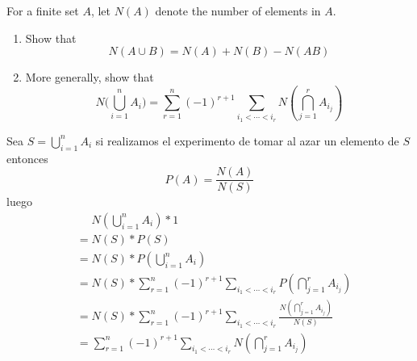 \item For a finite set $A$, let $N(A)$ denote the number of elements in $A$.
\begin{enumerate}
    \item Show that
    \[ N(A \cup B) = N(A) + N(B) - N(AB) \]

    
    \item More generally, show that
    \[
        N\Big( \bigcup_{i=1}^n A_i \Big) = \sum_{r=1}^n (-1)^{r+1} \sum_{i_1 < \cdots < i_r} N(\bigcap_{j=1}^r A_{i_j}) 
    \]
\end{enumerate}

Sea $S = \bigcup_{i=1}^n A_i$ si realizamos el experimento de tomar al azar un elemento de $S$ entonces 
\[ P(A) = \frac{N(A)}{N(S)} \]
luego
\begin{align*}
    &\phantom{{}={}} N(\bigcup_{i=1}^n A_i) * 1\\
    &= N(S) * P(S)\\
    &= N(S) * P(\bigcup_{i=1}^n A_i)\\
    &= N(S) * \sum_{r=1}^n (-1)^{r+1} \sum_{i_1 < \cdots < i_r} P(\bigcap_{j=1}^r A_{i_j})\\
    &= 
    N(S) * \sum_{r=1}^n (-1)^{r+1} \sum_{i_1 < \cdots < i_r} \frac{N(\bigcap_{j=1}^r A_{i_j})}{N(S)}\\
    &= 
    \sum_{r=1}^n (-1)^{r+1} \sum_{i_1 < \cdots < i_r} N(\bigcap_{j=1}^r A_{i_j})\\
\end{align*}
